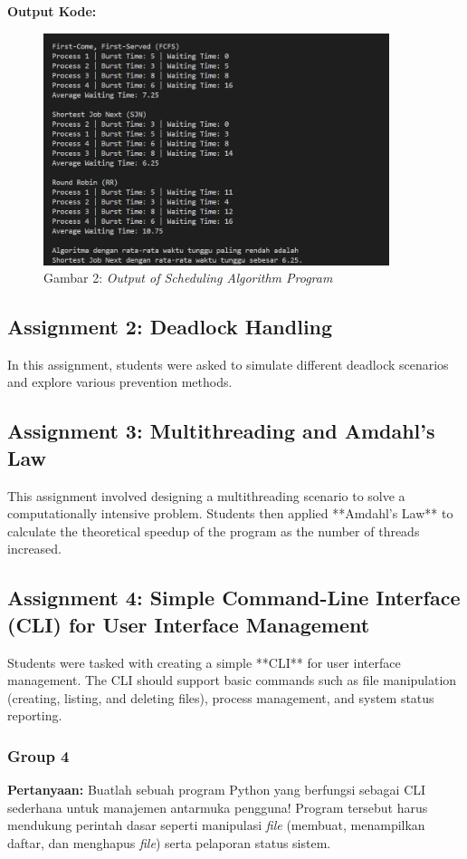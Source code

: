 \documentclass[12pt]{article}
\begin{document}
        \noindent \textbf{Output Kode:}
        \begin{figure}[h]
            \centering
            \includegraphics[width=0.9\textwidth]{asset/a1-output.png}
            \caption{Gambar 2: \textit{Output of Scheduling Algorithm Program}}
            \label{fig:a1-output}
        \end{figure}

\subsection{Assignment 2: Deadlock Handling}
In this assignment, students were asked to simulate different deadlock scenarios and explore various prevention methods.

\subsection{Assignment 3: Multithreading and Amdahl's Law}
This assignment involved designing a multithreading scenario to solve a computationally intensive problem. Students then applied **Amdahl's Law** to calculate the theoretical speedup of the program as the number of threads increased.

\subsection{Assignment 4: Simple Command-Line Interface (CLI) for User Interface Management}
Students were tasked with creating a simple **CLI** for user interface management. The CLI should support basic commands such as file manipulation (creating, listing, and deleting files), process management, and system status reporting.
\subsubsection{Group 4}
\noindent \textbf{Pertanyaan: }
Buatlah sebuah program Python yang berfungsi sebagai CLI sederhana untuk manajemen antarmuka pengguna! Program tersebut harus mendukung perintah dasar seperti manipulasi \textit{file} (membuat, menampilkan daftar, dan menghapus \textit{file}) serta pelaporan status sistem. \\
\end{document}
